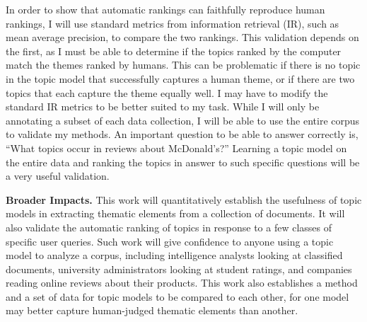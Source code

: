 \documentclass[onecolumn, 12pt]{article}
\begin{document}
In order to show that automatic rankings can faithfully reproduce human
rankings, I will use standard metrics from information retrieval (IR), such as
mean average precision, to compare the two rankings.  This validation depends
on the first, as I must be able to determine if the topics ranked by the
computer match the themes ranked by humans.  This can be problematic if there
is no topic in the topic model that successfully captures a human theme, or if
there are two topics that each capture the theme equally well.  I may have to
modify the standard IR metrics to be better suited to my task.  While I will
only be annotating a subset of each data collection, I will be able to use the
entire corpus to validate my methods.  An important question to be able to
answer correctly is, ``What topics occur in reviews about McDonald's?''
Learning a topic model on the entire data and ranking the topics in answer to
such specific questions will be a very useful validation.

\textbf{Broader Impacts.}  This work will quantitatively establish the
usefulness of topic models in extracting thematic elements from a collection of
documents.  It will also validate the automatic ranking of topics in response
to a few classes of specific user queries.  Such work will give confidence to
anyone using a topic model to analyze a corpus, including intelligence analysts
looking at classified documents, university administrators looking at student
ratings, and companies reading online reviews about their products.  This work
also establishes a method and a set of data for topic models to be compared to
each other, for one model may better capture human-judged thematic elements
than another.

\footnotesize

\renewcommand\bibsection{\subsubsection*{References}}

\end{document}
